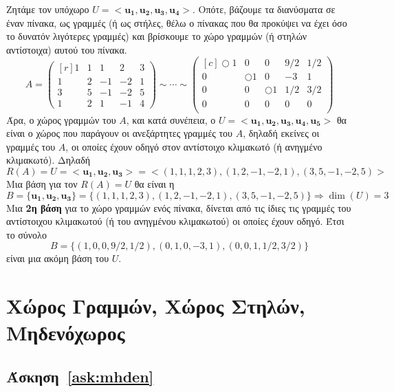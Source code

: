\documentclass[a4paper,table]{report}
\begin{document}
Ζητάμε τον υπόχωρο $ U = < \mathbf{u_{1}}, \mathbf{u_{2}}, \mathbf{u_{3}},
\mathbf{u_{4}} >  $. Οπότε, βάζουμε τα διανύσματα σε έναν πίνακα, ως γραμμές 
(ή ως στήλες, θέλω ο πίνακας που θα προκύψει να έχει όσο το δυνατόν λιγότερες γραμμές) 
και βρίσκουμε το χώρο γραμμών (ή στηλών αντίστοιχα) αυτού του πίνακα. 
\[
  A = \begin{pmatrix*}[r]
    1 & 1 & 1 & 2 & 3 \\
    1 & 2 & -1 & -2 & 1 \\
    3 & 5 & -1 & -2 & 5 \\
    1 & 2 & 1 & -1 & 4
  \end{pmatrix*} \sim \cdots \sim
  \begin{pmatrix*}[c]
    \Circle{1} & 0 & 0 & 9/2 & 1/2 \\
    0 & \Circle{1} & 0 & -3 & 1 \\
    0 & 0 & \Circle{1} & 1/2 & 3/2 \\
    0 & 0 & 0 & 0 & 0 \\
  \end{pmatrix*}
\] 
Άρα, ο χώρος γραμμών του $A$, και κατά συνέπεια, ο 
$ U = < \mathbf{u_{1}}, \mathbf{u_{2}}, \mathbf{u_{3}}, \mathbf{u_{4}}, 
\mathbf{u_{5}} >  $ θα είναι ο χώρος που παράγουν οι ανεξάρτητες γραμμές του $A$, 
δηλαδή εκείνες οι γραμμές του $A$, οι οποίες έχουν οδηγό στον αντίστοιχο κλιμακωτό (ή
ανηγμένο κλιμακωτό). Δηλαδή
\[
  R(A) = U = < \mathbf{u_{1}}, \mathbf{u_{2}}, \mathbf{u_{3}} > = 
  < (1,1,1,2,3), (1,2,-1,-2,1),(3,5,-1,-2,5) >  
\] 
Μια βάση για τον $ R(A) = U $ θα είναι η 
\[
  B = \{ \mathbf{u_{1}}, \mathbf{u_{2}}, \mathbf{u_{3}} \} = 
  \{  (1,1,1,2,3), (1,2,-1,-2,1),(3,5,-1,-2,5)  \} \Rightarrow 
  \dim(U) = 3
\]
Μια \textbf{2η βάση} για το χώρο γραμμών ενός πίνακα, δίνεται από τις
\textcolor{Col1}{ίδιες} τις γραμμές του αντίστοιχου κλιμακωτού 
(ή του ανηγμένου κλιμακωτού) οι οποίες έχουν οδηγό.  Έτσι το σύνολο 
\[
  B = \{ (1,0,0,9/2,1/2), (0,1,0,-3,1), (0,0,1,1/2,3/2)\}  
\] 
είναι μια ακόμη βάση του $U$.

\section*{Χώρος Γραμμών, Χώρος Στηλών, Μηδενόχωρος}

\subsection*{Άσκηση~\ref{ask:mhden}}
\end{document}
